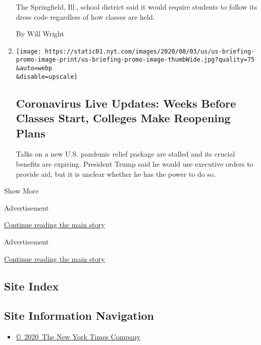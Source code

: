 \begin{enumerate}
  The Springfield, Ill., school district said it would require students
  to follow its dress code regardless of how classes are held.

  By Will Wright
\item
  \href{/2020/08/08/world/coronavirus-updates.html}{}

  \texttt{[image: https://static01.nyt.com/images/2020/08/03/us/us-briefing-promo-image-print/us-briefing-promo-image-thumbWide.jpg?quality=75\\\&auto=webp\\\&disable=upscale]}

  \hypertarget{coronavirus-live-updates-weeks-before-classes-start-colleges-make-reopening-plans}{%
  \subsection{Coronavirus Live Updates: Weeks Before Classes Start,
  Colleges Make Reopening
  Plans}\label{coronavirus-live-updates-weeks-before-classes-start-colleges-make-reopening-plans}}

  Talks on a new U.S. pandemic relief package are stalled and its
  crucial benefits are expiring. President Trump said he would use
  executive orders to provide aid, but it is unclear whether he has the
  power to do so.
\end{enumerate}

Show More

Advertisement

\protect\hyperlink{after-mid2}{Continue reading the main story}

Advertisement

\protect\hyperlink{after-mktg}{Continue reading the main story}

\hypertarget{site-index}{%
\subsection{Site Index}\label{site-index}}

\hypertarget{site-information-navigation}{%
\subsection{Site Information
Navigation}\label{site-information-navigation}}

\begin{itemize}
\tightlist
\item
  \href{https://help.nytimes.com/hc/en-us/articles/115014792127-Copyright-notice}{©~2020~The
  New York Times Company}
\end{itemize}

